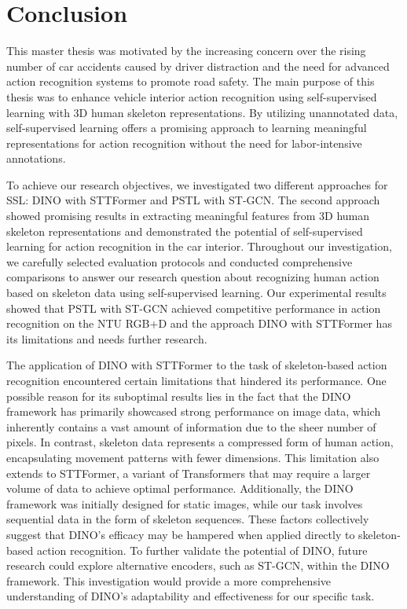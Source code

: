 \chapter{Conclusion}
This master thesis was motivated by the increasing concern over the rising number of car accidents caused by driver distraction and the need for advanced action recognition systems to promote road safety. The main purpose of this thesis was to enhance vehicle interior action recognition using self-supervised learning with 3D human skeleton representations. By utilizing unannotated data, self-supervised learning offers a promising approach to learning meaningful representations for action recognition without the need for labor-intensive annotations.

To achieve our research objectives, we investigated two different approaches for SSL: DINO with STTFormer and PSTL with ST-GCN. The second approach showed promising results in extracting meaningful features from 3D human skeleton representations and demonstrated the potential of self-supervised learning for action recognition in the car interior. Throughout our investigation, we carefully selected evaluation protocols and conducted comprehensive comparisons to answer our research question about recognizing human action based on skeleton data using self-supervised learning. Our experimental results showed that PSTL with ST-GCN achieved competitive performance in action recognition on the NTU RGB+D and the approach DINO with STTFormer has its limitations and needs further research. 

The application of DINO with STTFormer to the task of skeleton-based action recognition encountered certain limitations that hindered its performance. One possible reason for its suboptimal results lies in the fact that the DINO framework has primarily showcased strong performance on image data, which inherently contains a vast amount of information due to the sheer number of pixels. In contrast, skeleton data represents a compressed form of human action, encapsulating movement patterns with fewer dimensions. This limitation also extends to STTFormer, a variant of Transformers that may require a larger volume of data to achieve optimal performance. Additionally, the DINO framework was initially designed for static images, while our task involves sequential data in the form of skeleton sequences. These factors collectively suggest that DINO's efficacy may be hampered when applied directly to skeleton-based action recognition. To further validate the potential of DINO, future research could explore alternative encoders, such as ST-GCN, within the DINO framework. This investigation would provide a more comprehensive understanding of DINO's adaptability and effectiveness for our specific task.

